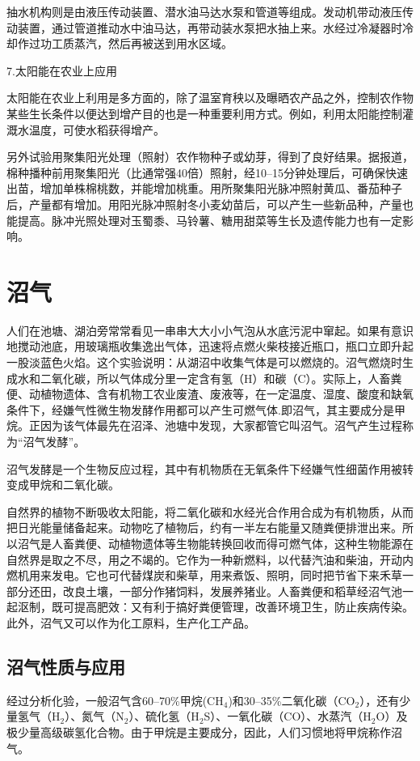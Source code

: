 \documentclass{ctexbook}
\begin{document}
抽水机构则是由液压传动装置、潜水油马达水泵和管道等组成。发动机带动液压传动装置，通过管道推动水中油马达，再带动装水泵把水抽上来。水经过冷凝器时冷却作过功工质蒸汽，然后再被送到用水区域。

7.太阳能在农业上应用

太阳能在农业上利用是多方面的，除了温室育秧以及曝晒农产品之外，控制农作物某些生长条件以便达到增产目的也是一种重要利用方式。例如，利用太阳能控制灌溉水温度，可使水稻获得增产。

另外试验用聚集阳光处理（照射）农作物种子或幼芽，得到了良好结果。据报道，棉种播种前用聚集阳光（比通常强40倍）照射，经10--15分钟处理后，可确保快速出苗，增加单株棉桃数，并能增加桃重。用所聚集阳光脉冲照射黄瓜、番茄种子后，产量都有增加。用阳光脉冲照射冬小麦幼苗后，可以产生一些新品种，产量也能提高。脉冲光照处理对玉蜀黍、马铃薯、糖用甜菜等生长及遗传能力也有一定影响。
\section{沼气}
人们在池塘、湖泊旁常常看见一串串大大小小气泡从水底污泥中窜起。如果有意识地搅动池底，用玻璃瓶收集逸出气体，迅速将点燃火柴枝接近瓶口，瓶口立即升起一股淡蓝色火焰。这个实验说明：从湖沼中收集气体是可以燃烧的。沼气燃烧时生成水和二氧化碳，所以气体成分里一定含有氢（H）和碳（C）。实际上，人畜粪便、动植物遗体、含有机物工农业废渣、废液等，在一定温度、湿度、酸度和缺氧条件下，经嫌气性微生物发酵作用都可以产生可燃气体.即沼气，其主要成分是甲烷。正因为该气体最先在沼泽、池塘中发现，大家都管它叫沼气。沼气产生过程称为“沼气发酵”。

沼气发酵是一个生物反应过程，其中有机物质在无氧条件下经嫌气性细菌作用被转变成甲烷和二氧化碳。

自然界的植物不断吸收太阳能，将二氧化碳和水经光合作用合成为有机物质，从而把日光能量储备起来。动物吃了植物后，约有一半左右能量又随粪便排泄出来。所以沼气是人畜粪便、动植物遗体等生物能转换回收而得可燃气体，这种生物能源在自然界是取之不尽，用之不竭的。它作为一种新燃料，以代替汽油和柴油，开动内燃机用来发电。它也可代替煤炭和柴草，用来煮饭、照明，同时把节省下来禾草一部分还田，改良土壤，一部分作猪饲料，发展养猪业。人畜粪便和稻草经沼气池一起沤制，既可提高肥效：又有利于搞好粪便管理，改善环境卫生，防止疾病传染。此外，沼气又可以作为化工原料，生产化工产品。

\subsection{沼气性质与应用}

经过分析化验，一般沼气含60--70\%甲烷(CH$_4$)和30--35\%二氧化碳（CO$_2$），还有少量氢气（H$_2$）、氮气（N$_2$）、硫化氢（H$_2$S）、一氧化碳（CO）、水蒸汽（H$_2$O）及极少量高级碳氢化合物。由于甲烷是主要成分，因此，人们习惯地将甲烷称作沼气。
\end{document}
